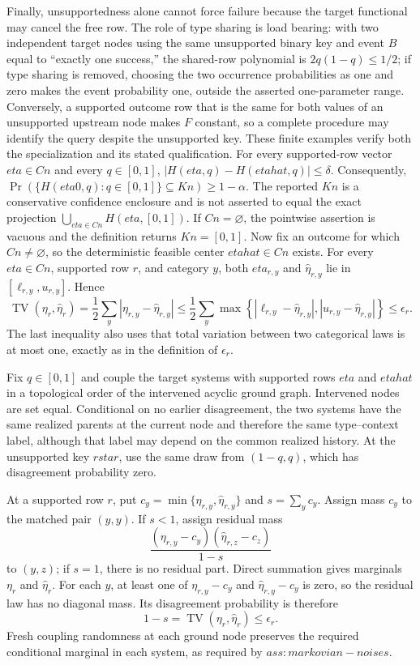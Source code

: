 Finally, unsupportedness alone cannot force failure because the target functional may cancel the free row.  The role of type sharing is load bearing: with two independent target nodes using the same unsupported binary key and event \(B\) equal to ``exactly one success,'' the shared-row polynomial is \(2q(1-q)\leq1/2\); if type sharing is removed, choosing the two occurrence probabilities as one and zero makes the event probability one, outside the asserted one-parameter range.  Conversely, a supported outcome row that is the same for both values of an unsupported upstream node makes \(F\) constant, so a complete procedure may identify the query despite the unsupported key.  These finite examples verify both the specialization and its stated qualification.
For every supported-row vector \(eta\in Cn\) and every \(q\in[0,1]\), \(|H(eta,q)-H(etahat,q)|\le\delta\). Consequently, \(\Pr(\{H(eta0,q):q\in[0,1]\}\subseteq Kn)\ge 1-\alpha\). The reported \(Kn\) is a conservative confidence enclosure and is not asserted to equal the exact projection \(\bigcup_{eta\in Cn}H(eta,[0,1])\).
If \(Cn=\varnothing\), the pointwise assertion is vacuous and the definition returns \(Kn=[0,1]\).  Now fix an outcome for which \(Cn\neq\varnothing\), so the deterministic feasible center \(etahat\in Cn\) exists.  For every \(eta\in Cn\), supported row \(r\), and category \(y\), both \(eta_{r,y}\) and \(\widehat\eta_{r,y}\) lie in \([\ell_{r,y},u_{r,y}]\).  Hence
\[
 \operatorname{TV}(\eta_r,\widehat\eta_r)
 =\frac12\sum_y|\eta_{r,y}-\widehat\eta_{r,y}|
 \leq\frac12\sum_y
 \max\!\left\{|\ell_{r,y}-\widehat\eta_{r,y}|,
                  |u_{r,y}-\widehat\eta_{r,y}|\right\}
 \leq\epsilon_r.
\]
The last inequality also uses that total variation between two categorical laws is at most one, exactly as in the definition of \(\epsilon_r\).

Fix \(q\in[0,1]\) and couple the target systems with supported rows \(eta\) and \(etahat\) in a topological order of the intervened acyclic ground graph.  Intervened nodes are set equal.  Conditional on no earlier disagreement, the two systems have the same realized parents at the current node and therefore the same type--context label, although that label may depend on the common realized history.  At the unsupported key \(rstar\), use the same draw from \((1-q,q)\), which has disagreement probability zero.

At a supported row \(r\), put \(c_y=\min\{\eta_{r,y},\widehat\eta_{r,y}\}\) and \(s=\sum_yc_y\).  Assign mass \(c_y\) to the matched pair \((y,y)\).  If \(s<1\), assign residual mass
\[
 \frac{(\eta_{r,y}-c_y)(\widehat\eta_{r,z}-c_z)}{1-s}
\]
to \((y,z)\); if \(s=1\), there is no residual part.  Direct summation gives marginals \(\eta_r\) and \(\widehat\eta_r\).  For each \(y\), at least one of \(\eta_{r,y}-c_y\) and \(\widehat\eta_{r,y}-c_y\) is zero, so the residual law has no diagonal mass.  Its disagreement probability is therefore
\[
 1-s=\operatorname{TV}(\eta_r,\widehat\eta_r)\leq\epsilon_r.
\]
Fresh coupling randomness at each ground node preserves the required conditional marginal in each system, as required by \(ass:markovian-noises\).

